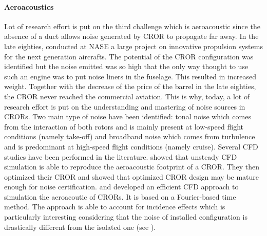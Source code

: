 \paragraph{Aeroacoustics}
Lot of research effort is put on the third challenge which
is aeroacoustic since the absence of a duct allows noise generated
by CROR to propagate far away.
In the late eighties, \citet{Hager1988}
conducted at NASE a large project on innovative propulsion systems for the
next generation aircrafts. The potential of the CROR configuration
was identified but the noise emitted was so high that the only way
thought to use such an engine was to put noise liners in the fuselage. This resulted in 
increased weight. Together with the decrease of the price of the
barrel in the late eighties, the CROR never reached the commercial
aviation. This is why, today, a lot of research effort is put on the
understanding and mastering of noise sources in CRORs.
Two main type of noise have been identified: tonal noise which comes from
the interaction of both rotors and is mainly present at low-speed flight conditions 
(namely take-off)
and broadband noise which comes from turbulence and is predominant
at high-speed flight conditions (namely cruise).
Several CFD studies have been performed in the literature.
\citet{Peters2012} showed that unsteady CFD simulation is able
to reproduce the aeroacoustic footprint of a CROR. They then optimized
their CROR and showed that optimized CROR design may be mature enough
for noise certification. \citet{Hoffer2012} and \citet{Ferrante2013}
developed an efficient CFD approach to simulation the aeroacoutic of CRORs.
It is based on a Fourier-based time method. The approach is able to
account for incidence effects which is particularly interesting
considering that the noise of installed configuration is drastically
different from the isolated one (see \citet{Hager1988}).

